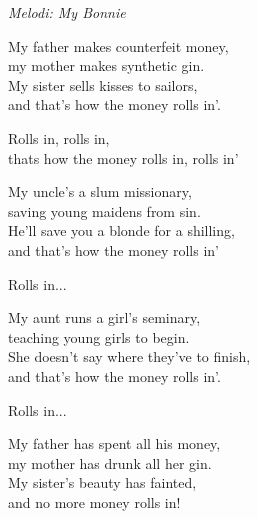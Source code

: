 {\footnotesize\textit{Melodi: My Bonnie}}\par
\vspace{10pt}
My father makes counterfeit money,\\
my mother makes synthetic gin.\\
My sister sells kisses to sailors,\\
and that's how the money rolls in'.\par
\vspace{10pt}
\revrpt Rolls in, rolls in,\\
thats how the money rolls in, rolls in'\rpt\par
\vspace{10pt}
My uncle's a slum missionary,\\
saving young maidens from sin.\\
He'll save you a blonde for a shilling,\\
and that's how the money rolls in'\par
\vspace{10pt}
Rolls in...\par
\vspace{10pt}
My aunt runs a girl's seminary,\\
teaching young girls to begin.\\
She doesn't say where they've to finish,\\
and that's how the money rolls in'.\par
\vspace{10pt}
Rolls in...\par
\vspace{10pt}
My father has spent all his money,\\
my mother has drunk all her gin.\\
My sister’s beauty has fainted,\\
and no more money rolls in!
